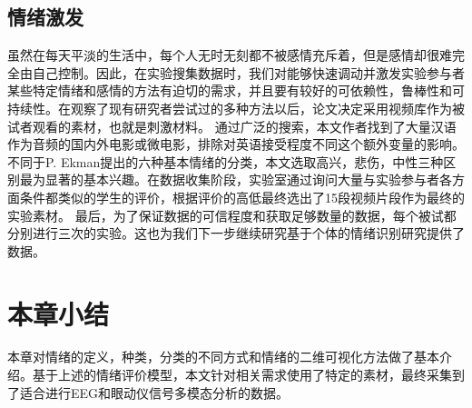 	 \subsection{情绪激发}
	 虽然在每天平淡的生活中，每个人无时无刻都不被感情充斥着，但是感情却很难完全由自己控制。因此，在实验搜集数据时，我们对能够快速调动并激发实验参与者某些特定情绪和感情的方法有迫切的需求，并且要有较好的可依赖性，鲁棒性和可持续性。在观察了现有研究者尝试过的多种方法以后，论文决定采用视频库作为被试者观看的素材，也就是刺激材料。
	 通过广泛的搜索，本文作者找到了大量汉语作为音频的国内外电影或微电影，排除对英语接受程度不同这个额外变量的影响。不同于P. Ekman提出的六种基本情绪的分类，本文选取高兴，悲伤，中性三种区别最为显著的基本兴趣。在数据收集阶段，实验室通过询问大量与实验参与者各方面条件都类似的学生的评价，根据评价的高低最终选出了15段视频片段作为最终的实验素材。
	 最后，为了保证数据的可信程度和获取足够数量的数据，每个被试都分别进行三次的实验。这也为我们下一步继续研究基于个体的情绪识别研究提供了数据。
\section{本章小结}
	本章对情绪的定义，种类，分类的不同方式和情绪的二维可视化方法做了基本介绍。基于上述的情绪评价模型，本文针对相关需求使用了特定的素材，最终采集到了适合进行EEG和眼动仪信号多模态分析的数据。

